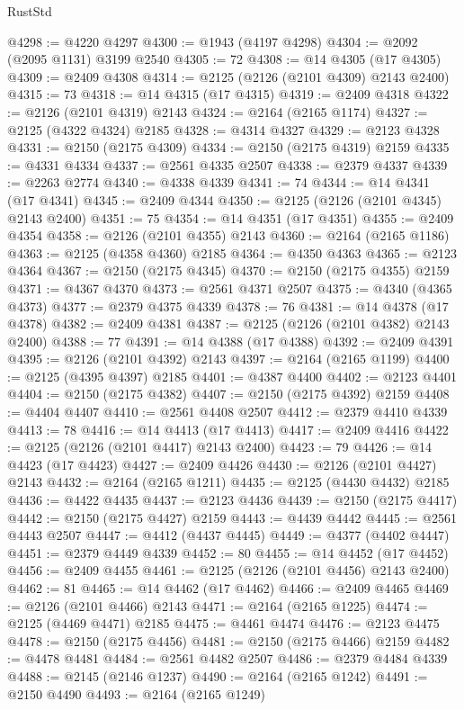 \begin{lexlean}{RustStd}
\begin{coremodule}
@4298 := @4220 @4297
@4300 := @1943 (@4197 @4298)
@4304 := @2092 (@2095 @1131) @3199 @2540
@4305 := 72
@4308 := @14 @4305 (@17 @4305)
@4309 := @2409 @4308
@4314 := @2125 (@2126 (@2101 @4309) @2143 @2400)
@4315 := 73
@4318 := @14 @4315 (@17 @4315)
@4319 := @2409 @4318
@4322 := @2126 (@2101 @4319) @2143
@4324 := @2164 (@2165 @1174)
@4327 := @2125 (@4322 @4324) @2185
@4328 := @4314 @4327
@4329 := @2123 @4328
@4331 := @2150 (@2175 @4309)
@4334 := @2150 (@2175 @4319) @2159
@4335 := @4331 @4334
@4337 := @2561 @4335 @2507
@4338 := @2379 @4337
@4339 := @2263 @2774
@4340 := @4338 @4339
@4341 := 74
@4344 := @14 @4341 (@17 @4341)
@4345 := @2409 @4344
@4350 := @2125 (@2126 (@2101 @4345) @2143 @2400)
@4351 := 75
@4354 := @14 @4351 (@17 @4351)
@4355 := @2409 @4354
@4358 := @2126 (@2101 @4355) @2143
@4360 := @2164 (@2165 @1186)
@4363 := @2125 (@4358 @4360) @2185
@4364 := @4350 @4363
@4365 := @2123 @4364
@4367 := @2150 (@2175 @4345)
@4370 := @2150 (@2175 @4355) @2159
@4371 := @4367 @4370
@4373 := @2561 @4371 @2507
@4375 := @4340 (@4365 @4373)
@4377 := @2379 @4375 @4339
@4378 := 76
@4381 := @14 @4378 (@17 @4378)
@4382 := @2409 @4381
@4387 := @2125 (@2126 (@2101 @4382) @2143 @2400)
@4388 := 77
@4391 := @14 @4388 (@17 @4388)
@4392 := @2409 @4391
@4395 := @2126 (@2101 @4392) @2143
@4397 := @2164 (@2165 @1199)
@4400 := @2125 (@4395 @4397) @2185
@4401 := @4387 @4400
@4402 := @2123 @4401
@4404 := @2150 (@2175 @4382)
@4407 := @2150 (@2175 @4392) @2159
@4408 := @4404 @4407
@4410 := @2561 @4408 @2507
@4412 := @2379 @4410 @4339
@4413 := 78
@4416 := @14 @4413 (@17 @4413)
@4417 := @2409 @4416
@4422 := @2125 (@2126 (@2101 @4417) @2143 @2400)
@4423 := 79
@4426 := @14 @4423 (@17 @4423)
@4427 := @2409 @4426
@4430 := @2126 (@2101 @4427) @2143
@4432 := @2164 (@2165 @1211)
@4435 := @2125 (@4430 @4432) @2185
@4436 := @4422 @4435
@4437 := @2123 @4436
@4439 := @2150 (@2175 @4417)
@4442 := @2150 (@2175 @4427) @2159
@4443 := @4439 @4442
@4445 := @2561 @4443 @2507
@4447 := @4412 (@4437 @4445)
@4449 := @4377 (@4402 @4447)
@4451 := @2379 @4449 @4339
@4452 := 80
@4455 := @14 @4452 (@17 @4452)
@4456 := @2409 @4455
@4461 := @2125 (@2126 (@2101 @4456) @2143 @2400)
@4462 := 81
@4465 := @14 @4462 (@17 @4462)
@4466 := @2409 @4465
@4469 := @2126 (@2101 @4466) @2143
@4471 := @2164 (@2165 @1225)
@4474 := @2125 (@4469 @4471) @2185
@4475 := @4461 @4474
@4476 := @2123 @4475
@4478 := @2150 (@2175 @4456)
@4481 := @2150 (@2175 @4466) @2159
@4482 := @4478 @4481
@4484 := @2561 @4482 @2507
@4486 := @2379 @4484 @4339
@4488 := @2145 (@2146 @1237)
@4490 := @2164 (@2165 @1242)
@4491 := @2150 @4490
@4493 := @2164 (@2165 @1249)

\end{coremodule}
\end{lexlean}
